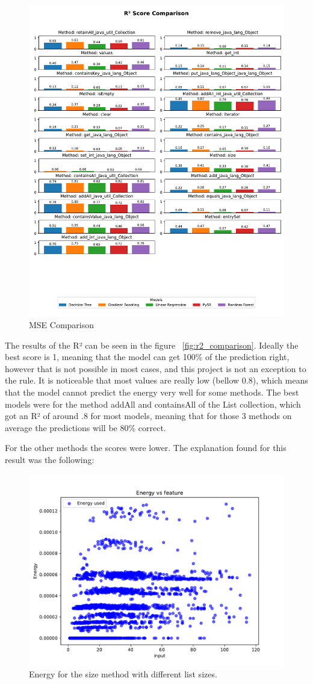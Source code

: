 \begin{figure}[htbp]
  \centering
  \includegraphics[width = .8 \textwidth]{figures/r2_comparison.pdf}
  \caption{MSE Comparison}
  \label{fig:mse_comparison}
\end{figure}

The results of the R² can be seen in the figure ~\ref{fig:r2_comparison}.
Ideally the best score is 1, meaning that the model can get 100\% of the prediction right, however that is not possible in most cases, and this project is not an exception to the rule. It is noticeable that most values are really low (bellow 0.8), which means that the model cannot predict the energy very well for some methods. The best models were for the method addAll and containsAll of the List collection, which got an R² of around .8 for most models, meaning that for those 3 methods on average the predictions will be 80\% correct.

For the other methods the scores were lower. The explanation found for this result was the following:


\begin{figure}[htbp]
  \centering
  \includegraphics[width = .8 \textwidth]{figures/size_energy.pdf}
  \caption{Energy for the size method with different list sizes.}
  \label{fig:size_energy}
\end{figure}

